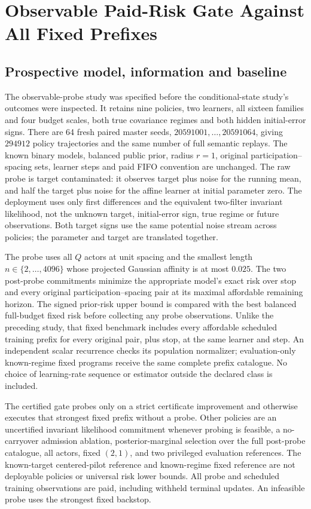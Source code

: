 \section{Observable Paid-Risk Gate Against All Fixed Prefixes}
\subsection{Prospective model, information and baseline}
The observable-probe study was specified before the conditional-state study's outcomes were inspected.
It retains nine policies, two learners, all sixteen families and four budget scales, both true covariance regimes and both hidden initial-error signs.
There are 64 fresh paired master seeds, $20591001,\ldots,20591064$, giving $294912$ policy trajectories and the same number of full semantic replays.
The known binary models, balanced public prior, radius $r=1$, original participation--spacing sets, learner steps and paid FIFO convention are unchanged.
The raw probe is target contaminated: it observes target plus noise for the running mean, and half the target plus noise for the affine learner at initial parameter zero.
The deployment uses only first differences and the equivalent two-filter invariant likelihood, not the unknown target, initial-error sign, true regime or future observations.
Both target signs use the same potential noise stream across policies; the parameter and target are translated together.

The probe uses all $Q$ actors at unit spacing and the smallest length $n\in\{2,\ldots,4096\}$ whose projected Gaussian affinity is at most $0.025$.
The two post-probe commitments minimize the appropriate model's exact risk over stop and every original participation--spacing pair at its maximal affordable remaining horizon.
The signed prior-risk upper bound is compared with the best balanced full-budget fixed risk before collecting any probe observations.
Unlike the preceding study, that fixed benchmark includes every affordable scheduled training prefix for every original pair, plus stop, at the same learner and step.
An independent scalar recurrence checks its population normalizer; evaluation-only known-regime fixed programs receive the same complete prefix catalogue.
No choice of learning-rate sequence or estimator outside the declared class is included.

The certified gate probes only on a strict certificate improvement and otherwise executes that strongest fixed prefix without a probe.
Other policies are an uncertified invariant likelihood commitment whenever probing is feasible, a no-carryover admission ablation, posterior-marginal selection over the full post-probe catalogue, all actors, fixed $(2,1)$, and two privileged evaluation references.
The known-target centered-pilot reference and known-regime fixed reference are not deployable policies or universal risk lower bounds.
All probe and scheduled training observations are paid, including withheld terminal updates.
An infeasible probe uses the strongest fixed backstop.

